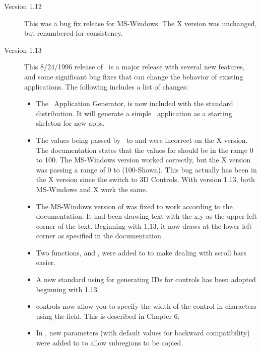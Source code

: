 \begin{description}
\item[Version 1.12]

This was a bug fix release for MS-Windows. The X version was
unchanged, but renumbered for consistency.

\item[Version 1.13]

This 8/24/1996 release of \V\ is a major release with several
new features, and some significant bug fixes that can change
the behavior of existing \V applications. The following includes
a list of changes:

\begin{itemize}

\item The \V\ Application Generator,  is now included
with the standard distribution. It will generate a simple
\V\ application as a starting skeleton for new apps.

\item The values being passed by \V\ to  and
 were incorrect on the X version. The documentation states
that the values for  should be in the range 0 to 100.
The MS-Windows version worked correctly, but the X version was
passing a range of 0 to (100-Shown). This bug actually has
been in the X version since the switch to 3D Controls. With
version 1.13, both MS-Windows and X work the same.

\item The MS-Windows version of  was fixed to
work according to the documentation. It had been drawing text
with the x,y as the upper left corner of the text. Beginning
with 1.13, it now draws at the lower left corner as specified
in the documentation.

\item Two functions,  and ,
were added to  to make dealing with
scroll bars easier.

\item A new standard using  for generating IDs for
controls has been adopted beginning with 1.13.

\item {} controls now allow you to specify the
width of the control in characters using the  field.
This is described in Chapter 6.

\item In , new parameters (with default
values for backward compatibility) were added to
 to allow subregions to be copied.


\end{itemize}
\end{description}
